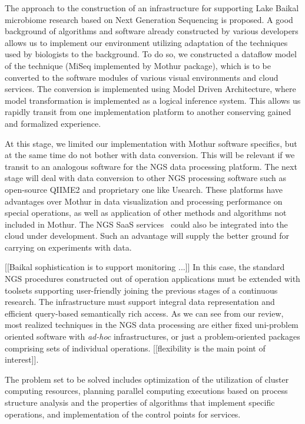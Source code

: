 \documentclass[a4paper]{jpconf}
\begin{document}
The approach to the construction of an infrastructure for supporting Lake Baikal microbiome research based on Next Generation Sequencing is proposed. A good background of algorithms and software already constructed by various developers allows us to implement our environment utilizing adaptation of the techniques used by biologists to the background.  To do so, we constructed a dataflow model of the technique (MiSeq implemented by Mothur package), which is to be converted to the software modules of various visual environments and cloud services.  The conversion is implemented using Model Driven Architecture, where model transformation is implemented as a logical inference system. This allows us rapidly transit from one implementation platform to another conserving gained and formalized experience.

At this stage, we limited our implementation with Mothur software specifics, but at the same time do not bother with data conversion.  This will be relevant if we transit to an analogous software for the NGS data processing platform.  The next stage will deal with data conversion to other NGS processing software such as open-source QIIME2 and proprietary one like Usearch.  These platforms have advantages over Mothur in data visualization and processing performance on special operations, as well as application of other methods and algorithms not included in Mothur. The NGS SaaS services~\cite{guo16,kwon15} could also be integrated into the cloud under development.  Such an advantage will supply the better ground for carrying on experiments with data.

[[Baikal sophistication is to support monitoring ...]]  In this case, the standard NGS procedures constructed out of operation applications must be extended with toolsets supporting user-friendly joining the previous stages of a continuous research.  The infrastructure must support integral data representation and efficient query-based semantically rich access.  As we can see from our review, most realized techniques in the NGS data processing are either fixed uni-problem oriented software with \emph{ad-hoc} infrastructures, or just a problem-oriented packages comprising sets of individual operations.  [[flexibility is the main point of interest]].

The problem set to be solved includes optimization of the utilization of cluster computing resources, planning parallel computing executions based on process structure analysis and the properties of algorithms that implement specific operations, and implementation of the control points for services.
\end{document}
